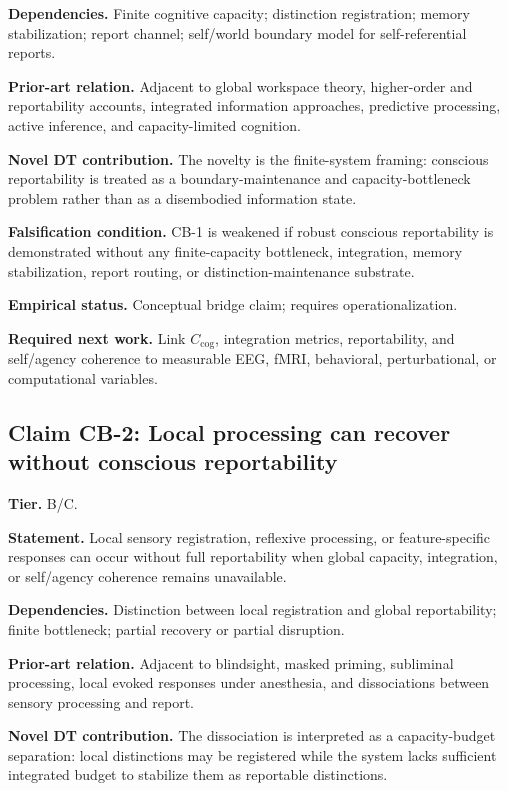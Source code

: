 \documentclass[10pt,a4paper,twocolumn,aps,prl]{revtex4-2}
\theoremstyle{claimstyle}
\theoremstyle{definition}
\newcommand{\claimfield}[1]{\noindent\textbf{#1.}}
\begin{document}
\claimfield{Dependencies} Finite cognitive capacity; distinction registration; memory stabilization; report channel; self/world boundary model for self-referential reports.

\claimfield{Prior-art relation} Adjacent to global workspace theory, higher-order and reportability accounts, integrated information approaches, predictive processing, active inference, and capacity-limited cognition.

\claimfield{Novel DT contribution} The novelty is the finite-system framing: conscious reportability is treated as a boundary-maintenance and capacity-bottleneck problem rather than as a disembodied information state.

\claimfield{Falsification condition} CB-1 is weakened if robust conscious reportability is demonstrated without any finite-capacity bottleneck, integration, memory stabilization, report routing, or distinction-maintenance substrate.

\claimfield{Empirical status} Conceptual bridge claim; requires operationalization.

\claimfield{Required next work} Link $C_{\mathrm{cog}}$, integration metrics, reportability, and self/agency coherence to measurable EEG, fMRI, behavioral, perturbational, or computational variables.

\subsection{Claim CB-2: Local processing can recover without conscious reportability}

\claimfield{Tier} B/C.

\claimfield{Statement} Local sensory registration, reflexive processing, or feature-specific responses can occur without full reportability when global capacity, integration, or self/agency coherence remains unavailable.

\claimfield{Dependencies} Distinction between local registration and global reportability; finite bottleneck; partial recovery or partial disruption.

\claimfield{Prior-art relation} Adjacent to blindsight, masked priming, subliminal processing, local evoked responses under anesthesia, and dissociations between sensory processing and report.

\claimfield{Novel DT contribution} The dissociation is interpreted as a capacity-budget separation: local distinctions may be registered while the system lacks sufficient integrated budget to stabilize them as reportable distinctions.
\end{document}
